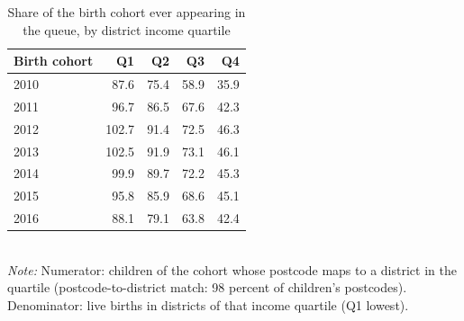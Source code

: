 \begin{table}[htbp]\centering
\caption{Share of the birth cohort ever appearing in the queue, by district income quartile}
\label{tab:S8b}
\small
\begin{tabular}{lrrrr}
\toprule
Birth cohort & Q1 & Q2 & Q3 & Q4 \\
\midrule
2010 & 87.6 & 75.4 & 58.9 & 35.9 \\
2011 & 96.7 & 86.5 & 67.6 & 42.3 \\
2012 & 102.7 & 91.4 & 72.5 & 46.3 \\
2013 & 102.5 & 91.9 & 73.1 & 46.1 \\
2014 & 99.9 & 89.7 & 72.2 & 45.3 \\
2015 & 95.8 & 85.9 & 68.6 & 45.1 \\
2016 & 88.1 & 79.1 & 63.8 & 42.4 \\
\bottomrule
\end{tabular}
\\[3pt]{\footnotesize \textit{Note:} Numerator: children of the cohort whose postcode maps to a district in the quartile (postcode-to-district match: 98 percent of children's postcodes). Denominator: live births in districts of that income quartile (Q1 lowest).}
\end{table}
